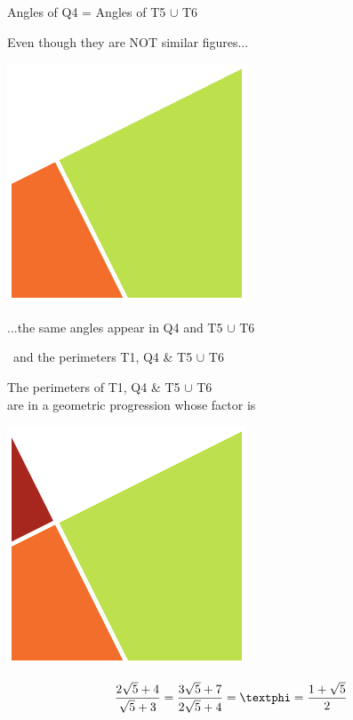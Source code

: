 \documentclass[14pt]{beamer}
\begin{document}
    \begin{frame}{Angles of Q4 = Angles of T5 $\cup$ T6}
        \begin{center}
            Even though they are NOT similar figures...
            \bigskip \bigskip

            \includegraphics[height=20ex]{figures/figure001g.pdf}

            \bigskip \bigskip

            ...the same angles appear in Q4 and T5 $\cup$ T6
        \end{center}
    \end{frame}


    \begin{frame}{\textphi\ and the perimeters T1, Q4 \& T5 $\cup$ T6}
        \begin{center}
            The perimeters of T1, Q4 \& T5 $\cup$ T6\\are in a geometric progression whose factor is \textphi

            \bigskip \bigskip

            \includegraphics[height=15ex]{figures/figure001h.pdf}

            $$\frac{2\sqrt{5} + 4}{\sqrt{5} + 3} = \frac{3\sqrt{5} + 7}{2\sqrt{5} + 4} = \text{\textphi} = \frac{1+\sqrt{5}}{2}$$
        \end{center}
    \end{frame}

\end{document}
